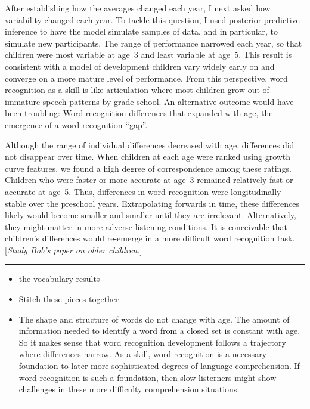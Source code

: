 \documentclass [11pt, proquest] {uwthesis}[2015/03/03]
\providecommand{\tightlist}{%
  \setlength{\itemsep}{0pt}\setlength{\parskip}{0pt}}
\begin{document}
After establishing how the averages changed each year, I next asked how
variability changed each year. To tackle this question, I used posterior
predictive inference to have the model simulate samples of data, and in
particular, to simulate new participants. The range of performance
narrowed each year, so that children were most variable at age~3 and
least variable at age~5. This result is consistent with a model of
development children vary widely early on and converge on a more mature
level of performance. From this perspective, word recognition as a skill
is like articulation where most children grow out of immature speech
patterns by grade school. An alternative outcome would have been
troubling: Word recognition differences that expanded with age, the
emergence of a word recognition ``gap''.

Although the range of individual differences decreased with age,
differences did not disappear over time. When children at each age were
ranked using growth curve features, we found a high degree of
correspondence among these ratings. Children who were faster or more
accurate at age~3 remained relatively fast or accurate at age~5. Thus,
differences in word recognition were longitudinally stable over the
preschool years. Extrapolating forwards in time, these differences
likely would become smaller and smaller until they are irrelevant.
Alternatively, they might matter in more adverse listening conditions.
It is conceivable that children's differences would re-emerge in a more
difficult word recognition task. {[}\emph{Study Bob's paper on older
children.}{]}
\begin{center}\rule{0.5\linewidth}{\linethickness}\end{center}
\begin{itemize}
\tightlist
\item
  the vocabulary results
\item
  Stitch these pieces together
\item
  The shape and structure of words do not change with age. The amount of
  information needed to identify a word from a closed set is constant
  with age. So it makes sense that word recognition development follows
  a trajectory where differences narrow. As a skill, word recognition is
  a necessary foundation to later more sophisticated degrees of language
  comprehension. If word recognition is such a foundation, then slow
  listerners might show challenges in these more difficulty
  comprehension situations.
\end{itemize}
\begin{center}\rule{0.5\linewidth}{\linethickness}\end{center}
\end{document}
